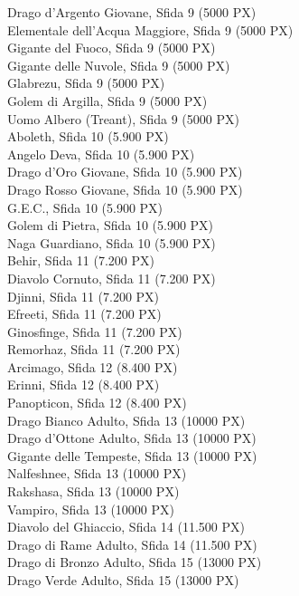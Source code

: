 \begin{multicols}{3}
{		Drago d'Argento Giovane, Sfida 9 (5000 PX)\\
		Elementale dell'Acqua Maggiore, Sfida 9 (5000 PX)\\
		Gigante del Fuoco, Sfida 9 (5000 PX)\\
		Gigante delle Nuvole, Sfida 9 (5000 PX)\\
		Glabrezu, Sfida 9 (5000 PX)\\
		Golem di Argilla, Sfida 9 (5000 PX)\\
		Uomo Albero (Treant), Sfida 9 (5000 PX)\\
		Aboleth, Sfida 10 (5.900 PX)\\
		Angelo Deva, Sfida 10 (5.900 PX)\\
		Drago d'Oro Giovane, Sfida 10 (5.900 PX)\\
		Drago Rosso Giovane, Sfida 10 (5.900 PX)\\
		G.E.C., Sfida 10 (5.900 PX)\\
		Golem di Pietra, Sfida 10 (5.900 PX)\\
		Naga Guardiano, Sfida 10 (5.900 PX)\\
		Behir, Sfida 11 (7.200 PX)\\
		Diavolo Cornuto, Sfida 11 (7.200 PX)\\
		Djinni, Sfida 11 (7.200 PX)\\
		Efreeti, Sfida 11 (7.200 PX)\\
		Ginosfinge, Sfida 11 (7.200 PX)\\
		Remorhaz, Sfida 11 (7.200 PX)\\
		Arcimago, Sfida 12 (8.400 PX)\\
		Erinni, Sfida 12 (8.400 PX)\\
		Panopticon, Sfida 12 (8.400 PX)\\
		Drago Bianco Adulto, Sfida 13 (10000 PX)\\
		Drago d'Ottone Adulto, Sfida 13 (10000 PX)\\
		Gigante delle Tempeste, Sfida 13 (10000 PX)\\
		Nalfeshnee, Sfida 13 (10000 PX)\\
		Rakshasa, Sfida 13 (10000 PX)\\
		Vampiro, Sfida 13 (10000 PX)\\
		Diavolo del Ghiaccio, Sfida 14 (11.500 PX)\\
		Drago di Rame Adulto, Sfida 14 (11.500 PX)\\
		Drago di Bronzo Adulto, Sfida 15 (13000 PX)\\
		Drago Verde Adulto, Sfida 15 (13000 PX)\\
}
\end{multicols}
